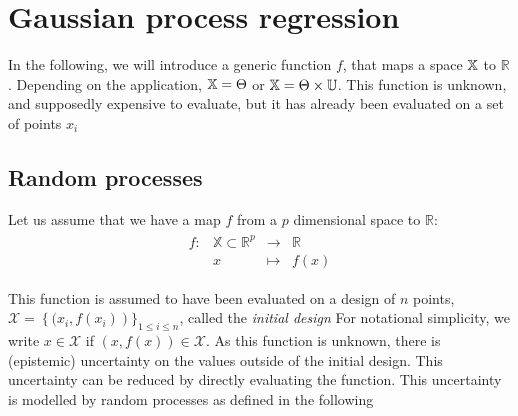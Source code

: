 \documentclass[../../Main_ManuscritThese.tex]{subfiles}
\begin{document}
\section{Gaussian process regression}
In the following, we will introduce a generic function $f$, that maps a space $\mathbb{X}$ to $\mathbb{R}$. Depending on the application, $\mathbb{X} = \Theta$ or $\mathbb{X} = \Theta \times \mathbb{U}$. This function is unknown, and supposedly expensive to evaluate, but it has already been evaluated on a set of points $x_i$
\cite{rasmussen_gaussian_2006}
\subsection{Random processes}
Let us assume that we have a map $f$ from a $p$ dimensional space to $\mathbb{R}$:
\begin{align}
  \begin{array}{rrcl}
    f: & \mathbb{X} \subset \mathbb{R}^p& \longrightarrow & \mathbb{R} \\
       & x & \longmapsto & f(x)
  \end{array}
\end{align}

This function is assumed to have been evaluated on a design of $n$ points, $\mathcal{X} = \left\{ (x_i, f(x_i) \right)\}_{1\leq i\leq n}$, called the \emph{initial design} For notational simplicity, we write $x\in \mathcal{X}$ if $(x, f(x)) \in \mathcal{X}$.
As this function is unknown, there is (epistemic) uncertainty on the values outside of the initial design. This uncertainty can be reduced by directly evaluating the function.
This uncertainty is modelled by random processes as defined in the following
\end{document}

